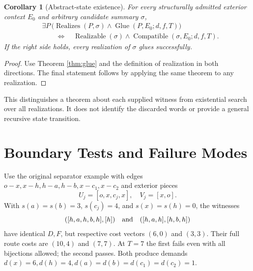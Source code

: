 \documentclass[11pt]{article}
\newtheorem{corollary}[definition]{Corollary}
\theoremstyle{remark}
\newcommand{\Compat}{\operatorname{Compatible}}
\newcommand{\Glue}{\operatorname{Glue}}
\newcommand{\Real}{\operatorname{Realizes}}
\begin{document}
\begin{corollary}[Abstract-state existence]\label{cor:abstract}
For every structurally admitted exterior context $E_0$ and arbitrary candidate
summary $\sigma$,
\[
 \begin{aligned}
 &\exists P\,\bigl(\Real(P,\sigma)\land\Glue(P,E_0;d,f,T)\bigr)\\
 &\qquad\Longleftrightarrow\quad
 \operatorname{Realizable}(\sigma)\land\Compat(\sigma,E_0;d,f,T).
 \end{aligned}
\]
If the right side holds, every realization of $\sigma$ glues successfully.
\end{corollary}
\begin{proof}
Use Theorem \ref{thm:glue} and the definition of realization in both directions.
The final statement follows by applying the same theorem to any realization.
\end{proof}
This distinguishes a theorem about each supplied witness from existential
search over all realizations. It does not identify the discarded words or
provide a general recursive state transition.

\section{Boundary Tests and Failure Modes}
\label{sec:tests}

Use the original separator example with edges
$o-x,x-h,h-a,h-b,x-c_1,x-c_2$ and exterior pieces
\[
 U_j=[o,x,c_j,x],\quad V_j=[x,o].
\]
With $s(a)=s(b)=3$, $s(c_j)=4$, and $s(x)=s(h)=0$, the witnesses
\[
 ([h,a,h,b,h],[h])\quad\hbox{and}\quad([h,a,h],[h,b,h])
\]
have identical $D,F$, but respective cost vectors $(6,0)$ and $(3,3)$.
Their full route costs are $(10,4)$ and $(7,7)$. At $T=7$ the first fails
even with all bijections allowed; the second passes. Both produce demands
$d(x)=6,d(h)=4,d(a)=d(b)=d(c_1)=d(c_2)=1$.
\end{document}
